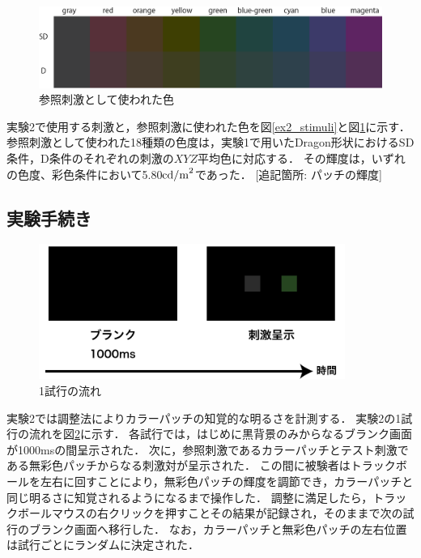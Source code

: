             \begin{figure}[h]
                \centering
                \includegraphics[width=14.0cm]{./img/ex2_stimuli_p.png}
                \caption{参照刺激として使われた色}
                \label{ex2_stimuli_set}
            \end{figure}
            \newpage

            実験2で使用する刺激と，参照刺激に使われた色を図\ref{ex2_stimuli}と図\ref{ex2_stimuli_set}に示す．
            参照刺激として使われた18種類の色度は，実験1で用いたDragon形状におけるSD条件，D条件のそれぞれの刺激の$XYZ$平均色に対応する．
            その輝度は，いずれの色度、彩色条件において5.80${\rm cd/m}^2$であった．
            [追記箇所: パッチの輝度]

        \subsection{実験手続き}

            \begin{figure}[h]
                \centering
                \includegraphics[width=10.0cm]{./img/ex2_procedure.png}
                \caption{1試行の流れ}
                \label{ex2_procedure}
            \end{figure}

            実験2では調整法によりカラーパッチの知覚的な明るさを計測する．
            実験2の1試行の流れを図\ref{ex2_procedure}に示す．
            各試行では，はじめに黒背景のみからなるブランク画面が1000msの間呈示された．
            次に，参照刺激であるカラーパッチとテスト刺激である無彩色パッチからなる刺激対が呈示された．
            この間に被験者はトラックボールを左右に回すことにより，無彩色パッチの輝度を調節でき，カラーパッチと同じ明るさに知覚されるようになるまで操作した．
            調整に満足したら，トラックボールマウスの右クリックを押すことその結果が記録され，そのままで次の試行のブランク画面へ移行した．
            なお，カラーパッチと無彩色パッチの左右位置は試行ごとにランダムに決定された．

